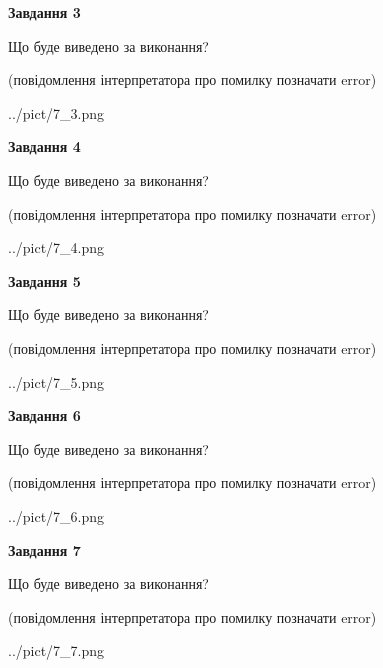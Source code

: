 \documentclass[12pt, ukrainian]{article}
\begin{document}
{\begin {large}
{\begin {center}\textbf{Завдання 3}\end {center}}\par
Що буде виведено за виконання?\par
 (повідомлення інтерпретатора про помилку позначати error)\par
\begin{center}
	{../pict/7_3.png}
\end{center}
\newpage

{\begin {center}\textbf{Завдання 4}\end {center}}\par
Що буде виведено за виконання?\par
 (повідомлення інтерпретатора про помилку позначати error)\par
\begin{center}
	{../pict/7_4.png}
\end{center}
\newpage

{\begin {center}\textbf{Завдання 5}\end {center}}\par
Що буде виведено за виконання?\par
 (повідомлення інтерпретатора про помилку позначати error)\par
\begin{center}
	{../pict/7_5.png}
\end{center}
\newpage

{\begin {center}\textbf{Завдання 6}\end {center}}\par
Що буде виведено за виконання?\par
 (повідомлення інтерпретатора про помилку позначати error)\par
\begin{center}
	{../pict/7_6.png}
\end{center}
\newpage

{\begin {center}\textbf{Завдання 7}\end {center}}\par
Що буде виведено за виконання?\par
 (повідомлення інтерпретатора про помилку позначати error)\par
\begin{center}
	{../pict/7_7.png}
\end{center}
\newpage


\end{large}}
\end{document}
